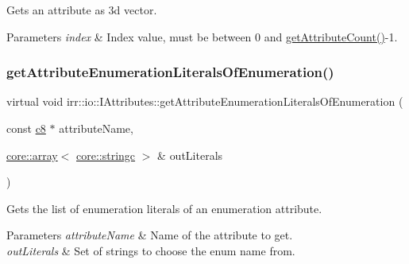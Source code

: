 Gets an attribute as 3d vector. 


\begin{DoxyParams}{Parameters}
{\em index} & Index value, must be between 0 and \hyperlink{classirr_1_1io_1_1IAttributes_a796bdd9440ee7ba0b6742a90a82870b6}{get\+Attribute\+Count()}-\/1. \\
\hline
\end{DoxyParams}
\mbox{\label{classirr_1_1io_1_1IAttributes_a74980af4d5297b74670f55711e25fd79}} 
\subsubsection{\texorpdfstring{get\+Attribute\+Enumeration\+Literals\+Of\+Enumeration()}{getAttributeEnumerationLiteralsOfEnumeration()}\hspace{0.1cm}{\footnotesize\ttfamily [1/2]}}
{\footnotesize\ttfamily virtual void irr\+::io\+::\+I\+Attributes\+::get\+Attribute\+Enumeration\+Literals\+Of\+Enumeration (\begin{DoxyParamCaption}\item[{const \hyperlink{namespaceirr_a9395eaea339bcb546b319e9c96bf7410}{c8} $\ast$}]{attribute\+Name,  }\item[{\hyperlink{classirr_1_1core_1_1array}{core\+::array}$<$ \hyperlink{namespaceirr_1_1core_ade1071a878633f2f6d8a75c5d11fec19}{core\+::stringc} $>$ \&}]{out\+Literals }\end{DoxyParamCaption})\hspace{0.3cm}{\ttfamily [pure virtual]}}



Gets the list of enumeration literals of an enumeration attribute. 


\begin{DoxyParams}{Parameters}
{\em attribute\+Name} & Name of the attribute to get. \\
\hline
{\em out\+Literals} & Set of strings to choose the enum name from. \\
\hline
\end{DoxyParams}
\mbox{\label{classirr_1_1io_1_1IAttributes_ae5d5d0c42a5a0199baf12abe971cb610}} 
